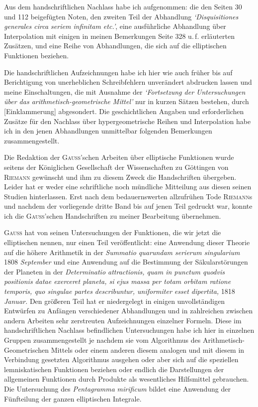Aus dem handschriftlichen Nachlass habe ich aufgenommen: die den Seiten 30 und 112 beigefügten Noten, den zweiten Teil der Abhandlung \textit{‘Disquisitiones generales circa seriem infinitam etc.’}, eine
ausführliche Abhandlung über Interpolation mit einigen in meinen Bemerkungen Seite 328 u.\,f. erläuterten
Zusätzen, und eine Reihe von Abhandlungen, die sich auf die elliptischen Funktionen beziehen.

Die handschriftlichen Aufzeichnungen habe ich hier wie auch früher bis auf Berichtigung von unerheblichen Schreibfehlern unverändert abdrucken lassen und meine Einschaltungen, die mit Ausnahme der
\textit{‘Fortsetzung der Untersuchungen über das arithmetisch-geometrische Mittel’} nur in kurzen Sätzen bestehen,
durch [Einklammerung] abgesondert. Die geschichtlichen Angaben und erforderlichen Zusätze für den Nachlass über hypergeometrische Reihen und Interpolation habe ich in den jenen Abhandlungen unmittelbar
folgenden Bemerkungen zusammengestellt.

\bigskip
Die Redaktion der \textsc{Gauss}’schen Arbeiten über elliptische Funktionen wurde seitens der Königlichen
Gesellschaft der Wissenschaften zu Göttingen von \textsc{Riemann} gewünscht und ihm zu diesem Zweck die Handschriften übergeben. Leider hat er weder eine schriftliche noch mündliche Mitteilung aus diesen seinen
Studien hinterlassen. Erst nach dem bedauernswerten allzufrühen Tode \textsc{Riemann}s und nachdem der vorliegende dritte Band bis auf jenen Teil gedruckt war, konnte ich die \textsc{Gauss}’schen Handschriften zu meiner Bearbeitung übernehmen.

\bigskip
\textsc{Gauss} hat von seinen Untersuchungen der Funktionen, die wir jetzt die elliptischen nennen, nur einen Teil veröffentlicht: eine Anwendung dieser Theorie auf die höhere Arithmetik in der \textit{Summatio quarundam serierum singularium} 1808 \textit{September} und eine Anwendung auf die Bestimmung der Säkularstörungen
der Planeten in der \textit{Determinatio attractionis, quam in punctum quodvis positionis datae exerceret planeta, si}
\textit{ejus massa per totam orbitam ratione temporis, quo singulae partes describuntur, uniformiter esset dipertita,} 1818
\textit{Januar.} Den größeren Teil hat er niedergelegt in einigen unvollständigen Entwürfen zu Anfängen verschiedener Abhandlungen und in zahlreichen zwischen andern Arbeiten sehr zerstreuten Aufzeichnungen einzelner
Formeln. Diese im handschriftlichen Nachlass befindlichen Untersuchungen habe ich hier in einzelnen
Gruppen zusammengestellt je nachdem sie vom Algorithmus des Arithmetisch-Geometrischen Mittels oder einem anderen diesem analogen und mit diesem in Verbindung gesetzten Algorithmus ausgehen oder aber
sich auf die speziellen lemniskatischen Funktionen beziehen oder endlich die Darstellungen der allgemeinen
Funktionen durch Produkte als wesentliches Hilfsmittel gebrauchen. Die Untersuchung des \textit{Pentagramma}
\textit{mirificum} bildet eine Anwendung der Fünfteilung der ganzen elliptischen Integrale.

